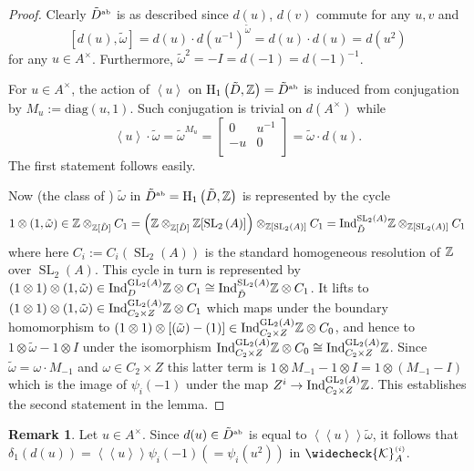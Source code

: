 \documentclass[12pt]{amsart}
\theoremstyle{definition}
\newtheorem{rem}[lem]{Remark}
\newcommand{\Z}{\Bbb{Z}}
\newcommand{\K}{\mathcal{K}}
\newcommand{\spl}[2]{\operatorname{SL}_{#1}\left(#2\right)}
\newcommand{\gl}[2]{\mathrm{GL}_{#1}(#2)}
\newcommand{\suss}[2]{\psi_{#1}\left( #2\right)}
\newcommand{\cks}[2]{\widecheck{{\K}}^{\mbox{\tiny $(#1)$}}_{#2}}
\newcommand{\<}{\langle}
\renewcommand{\>}{\rangle}
\newcommand{\an}[1]{\left\langle{#1}\right\rangle}
\newcommand{\pf}[1]{\left\langle\!\left\langle{#1}\right\rangle\!\right\rangle}
\newcommand{\gab}[1]{{#1}^{\mbox{\tiny{ab}}}}%
\newcommand{\ho}[3]{\mathrm{H}_{#1}\left( #2,#3 \right)}
\newcommand{\Ind}[3]{\mathrm{Ind}_{#1}^{#2}#3}
\begin{document}
\begin{proof}  Clearly $\gab{\tilde{D}}$ is as described since $d(u)$, $d(v)$ commute for any $u,v$ and 
\[
[d(u),\tilde{\omega}]=d(u)\cdot d(u^{-1})^{\tilde{\omega}}=d(u)\cdot d(u)=d(u^2)
\]
for any $u\in A^\times$. Furthermore, $\tilde{\omega}^2=-I=d(-1)=d(-1)^{-1}$.

For $u\in A^\times$, the action of $\an{u}$ on $\ho{1}{\tilde{D}}{\Z}=\gab{\tilde{D}}$ is induced from conjugation by $M_u:=\mathrm{diag}(u,1)$.
Such conjugation is trivial on $d(A^\times)$ while 
\[
\an{u}\cdot\tilde{\omega}=\tilde{\omega}^{M_u}=
\left[
\begin{array}{cc}
0&u^{-1}\\
-u&0\\
\end{array}
\right]
=\tilde{\omega}\cdot d(u).
\]
The first statement follows easily.

Now (the class of ) $\tilde{\omega}$ in $\gab{\tilde{D}}=\ho{1}{\tilde{D}}{\Z}$ is represented by the cycle 
\[
1\otimes (1,\tilde{\omega})\in \Z\otimes_{\Z[\tilde{D}]}C_1= \left(\Z\otimes_{\Z[\tilde{D}]}\Z[\spl{2}{A}]\right)\otimes_{\Z[\spl{2}{A}]}C_1=\Ind{\tilde{D}}{\spl{2}{A}}{\Z}\otimes_
{\Z[\spl{2}{A}]}C_1
\]
where here $C_i:=C_i(\spl{2}{A})$ is the standard homogeneous resolution of $\Z$ over $\spl{2}{A}$. This cycle in turn is represented by 
$(1\otimes 1)\otimes (1,\tilde{\omega})\in \Ind{D}{\gl{2}{A}}{\Z}\otimes C_1\cong \Ind{\tilde{D}}{\spl{2}{A}}{\Z}\otimes C_1$. It lifts to 
$(1\otimes 1)\otimes (1,\tilde{\omega})\in \Ind{C_2\times Z}{\gl{2}{A}}{\Z}\otimes C_1$ which maps under the boundary homomorphism to 
$(1\otimes 1)\otimes \left[ (\tilde{\omega})-(1)\right]\in \Ind{C_2\times Z}{\gl{2}{A}}{\Z}\otimes C_0$, and hence to $1\otimes \tilde{\omega}-1\otimes I$ 
under the isomorphism $\Ind{C_2\times Z}{\gl{2}{A}}{\Z}\otimes C_0\cong \Ind{C_2\times Z}{\gl{2}{A}}{\Z}$. Since $\tilde{\omega}=\omega\cdot M_{-1}$ and $\omega\in C_2\times Z$ this latter term is $1\otimes M_{-1}-1\otimes I=1\otimes (M_{-1}-I)$ which is the image of $\suss{i}{-1}$ under the map $Z^i\to\Ind{C_2\times Z}{\gl{2}{A}}{\Z}$. This establishes the second statement in the lemma.
\end{proof}

\begin{rem} Let $u\in A^\times$. Since $d(u)\in\gab{\tilde{D}}$ is equal to $\pf{u}\tilde{\omega}$, it follows that $\delta_1(d(u))=\pf{u}\suss{i}{-1} (=\suss{i}{u^2})$ in $\cks{i}{A}$.
\end{rem}
\end{document}
